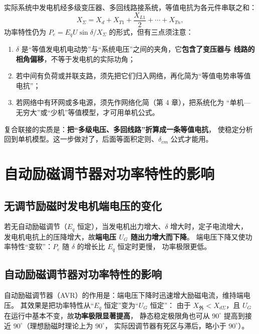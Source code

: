 实际系统中发电机经多级变压器、多回线路接系统，等值电抗为各元件串联之和：
\begin{equation}
  X_{\Sigma}=X_d+X_{T1}+\frac{X_{L1}}{2}+\cdots+X_{Tn},
\end{equation}
功率特性仍为 $P_e=E_qU\sin\delta/X_{\Sigma}$ 的形式，但有三点须注意：
\begin{enumerate}
  \item $\delta$ 是“等值发电机电动势”与“系统电压”之间的夹角，它\textbf{包含了变压器与
        线路的相角偏移}，不等于发电机的实际功角；
  \item 若中间有负荷或并联支路，须先把它们归入网络，再化简为“等值电势串等值电抗”；
  \item 若网络中有环网或多电源，须先作网络化简（第 4 章），把系统化为
        “单机—无穷大”或“少机”等值模型，才可用单机公式。
\end{enumerate}
复合联接的实质是：\textbf{把“多级电压、多回线路”折算成一条等值电抗}，
使稳定分析回到单机模型。这一步做对了，后面等面积定则、$\delta_{cm}$ 公式才能用。

\section{自动励磁调节器对功率特性的影响}

\subsection{无调节励磁时发电机端电压的变化}

若无自动励磁调节（$E_q$ 恒定），当发电机出力增大、$\delta$ 增大时，定子电流增大，
发电机电抗上的压降增大，故\textbf{端电压 $U_G$ 随出力增大而下降}。
端电压下降又使功率特性“变软”：$P_e$ 随 $\delta$ 的增长比 $E_q$ 恒定时更慢，
功率极限更低。

\subsection{自动励磁调节器对功率特性的影响}

自动励磁调节器（AVR）的作用是：端电压下降时迅速增大励磁电流，维持端电压。
其效果是把功率特性从“$E_q$ 恒定”变为“$U_G$ 恒定”：
由于 $X_{\text{外}}<X_{d\Sigma}$，且 $U_G$ 在运行中基本不变，故\textbf{功率极限显著提高}，
静态稳定极限角也可从 $90^\circ$ 提高到接近 $90^\circ$（理想励磁时理论上为 $90^\circ$，
实际因调节器有死区与滞后，略小于 $90^\circ$）。

